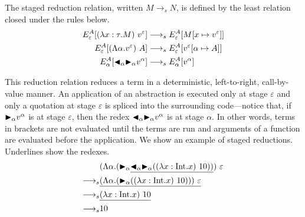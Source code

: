 \begin{definition}\sloppy
    The staged reduction relation, written $M \longrightarrow_s N$, is defined by
    the least relation closed under the rules below.
    \begin{align*}
        E^A_\varepsilon [(\lambda x:\tau.M)\ v^\varepsilon] & \longrightarrow_s E^A_\varepsilon[M[x\mapsto v^\varepsilon]]      \\
        E^A_\varepsilon [(\Lambda\alpha.v^\varepsilon)\ A]  & \longrightarrow_s E^A_\varepsilon[v^\varepsilon[\alpha\mapsto A]] \\
        E^A_\alpha [{\mathop{\blacktriangleleft}}_\alpha {\mathop{\blacktriangleright}}_\alpha v^\alpha]        & \longrightarrow_s E^A_\alpha[v^\alpha]                            \\
    \end{align*}
\end{definition}

This reduction relation reduces a term in a deterministic, left-to-right,
call-by-value manner. An application of an abstraction is executed only at
stage \(\varepsilon\) and only a quotation at stage \(\varepsilon\) is spliced
into the surrounding code---notice that, if \({\mathop{\blacktriangleright}}_\alpha v^\alpha\) is at stage
\(\varepsilon\), then the redex \({\mathop{\blacktriangleleft}}_\alpha {\mathop{\blacktriangleright}}_\alpha v^\alpha\) is at stage
\(\alpha\). In other words, terms in brackets are not evaluated until the terms
are run and arguments of a function are evaluated before the application.  We
show an example of staged reductions. Underlines show the redexes.
\begin{align*}
    & (\Lambda\alpha.(\TB_\alpha \underline{\TBL_\alpha \TB_\alpha ((\lambda x:\I.x)\ 10))})\ \varepsilon \\
    \longrightarrow_s & \underline{(\Lambda\alpha.(\TB_\alpha ((\lambda x:\I.x)\ 10)))\ \varepsilon}                        \\
    \longrightarrow_s & \underline{(\lambda x:\I.x)\ 10}                                                                    \\
    \longrightarrow_s & 10
\end{align*}
